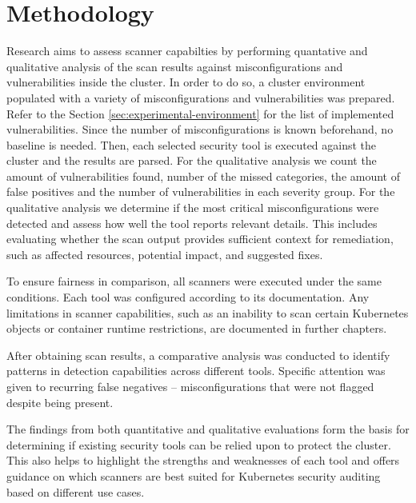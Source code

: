 \section{Methodology}
\label{sec:methodology}

Research aims to assess scanner capabilties by performing quantative and qualitative analysis of the scan results against misconfigurations and vulnerabilities inside the cluster. In order to do so, a cluster environment populated with a variety of misconfigurations and vulnerabilities was prepared. Refer to the Section \ref{sec:experimental-environment} for the list of implemented vulnerabilities. Since the number of misconfigurations is known beforehand, no baseline is needed. Then, each selected security tool is executed against the cluster and the results are parsed. For the qualitative analysis we count the amount of vulnerabilities found, number of the missed categories, the amount of false positives and the number of vulnerabilities in each severity group. For the qualitative analysis we determine if the most critical misconfigurations were detected and assess how well the tool reports relevant details. This includes evaluating whether the scan output provides sufficient context for remediation, such as affected resources, potential impact, and suggested fixes.

To ensure fairness in comparison, all scanners were executed under the same conditions. Each tool was configured according to its documentation. Any limitations in scanner capabilities, such as an inability to scan certain Kubernetes objects or container runtime restrictions, are documented in further chapters.

After obtaining scan results, a comparative analysis was conducted to identify patterns in detection capabilities across different tools. Specific attention was given to recurring false negatives -- misconfigurations that were not flagged despite being present.

The findings from both quantitative and qualitative evaluations form the basis for determining if existing security tools can be relied upon to protect the cluster. This also helps to highlight the strengths and weaknesses of each tool and offers guidance on which scanners are best suited for Kubernetes security auditing based on different use cases.